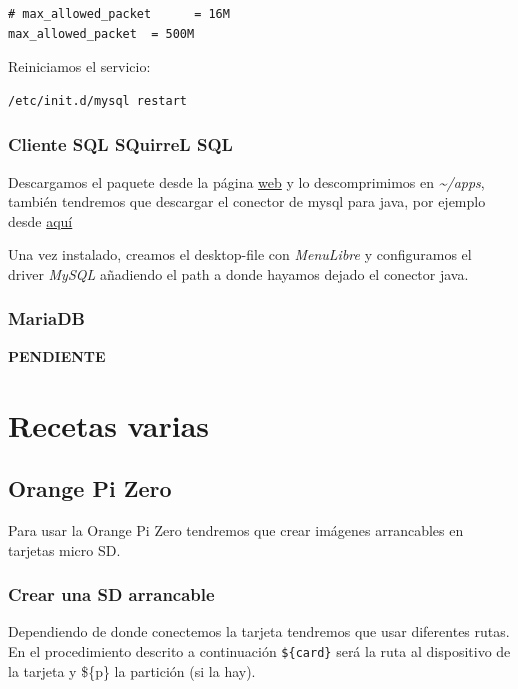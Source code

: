 \documentclass[12pt,spanish,]{article}
\begin{document}
\begin{verbatim}
# max_allowed_packet      = 16M
max_allowed_packet  = 500M
\end{verbatim}

Reiniciamos el servicio:

\begin{verbatim}
/etc/init.d/mysql restart
\end{verbatim}

\subsubsection{Cliente SQL SQuirreL SQL}\label{cliente-sql-squirrel-sql}

Descargamos el paquete desde la página
\href{http://squirrel-sql.sourceforge.net/}{web} y lo descomprimimos en
\emph{\textasciitilde{}/apps}, también tendremos que descargar el
conector de mysql para java, por ejemplo desde
\href{http://dev.mysql.com/downloads/connector/j/3.0.html}{aquí}

Una vez instalado, creamos el desktop-file con \emph{MenuLibre} y
configuramos el driver \emph{MySQL} añadiendo el path a donde hayamos
dejado el conector java.

\subsubsection{MariaDB}\label{mariadb}

\textbf{PENDIENTE}

\section{Recetas varias}\label{recetas-varias}

\subsection{Orange Pi Zero}\label{orange-pi-zero}

Para usar la Orange Pi Zero tendremos que crear imágenes arrancables en
tarjetas micro SD.

\subsubsection{Crear una SD arrancable}\label{crear-una-sd-arrancable}

Dependiendo de donde conectemos la tarjeta tendremos que usar diferentes
rutas. En el procedimiento descrito a continuación \texttt{\$\{card\}}
será la ruta al dispositivo de la tarjeta y \$\{p\} la partición (si la
hay).
\end{document}
